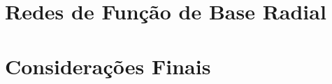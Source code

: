 \documentclass[qual, classic, a4paper]{ufbathesis}
\begin{document}
\section{Redes de Função de Base Radial}
\blindtext

\section{Considerações Finais}
\blindtext


\backmatter





%
% 
% 

\end{document}
